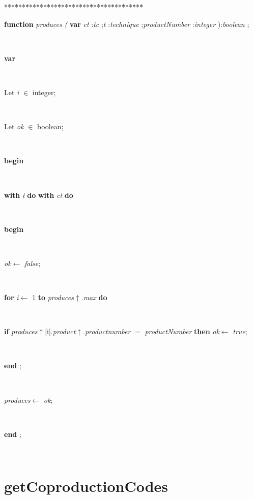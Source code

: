 \begin{tabbing}
***\=***\=***\=***\=***\=***\=***\=***\=***\=***\=***\=***\=***\=\kill
\parbox{14cm}{\textsf{\textbf{function}   \textit{produces} \textit{(} \textbf{var}  \textit{ct} :\textit{tc} ;\textit{t}  :\textit{technique} ;\textit{productNumber} :\textit{integer} ):\textit{boolean} ;}}\\
\+\parbox{14cm}{\textsf{\textbf{var} }}\\
\parbox{14cm}{\textsf{Let \textit{i} $\in$ integer;}}\\
\parbox{14cm}{\textsf{Let \textit{ok} $\in$ boolean;}}\\
\-\<\+\parbox{14cm}{\textsf{\textbf{begin} }}\\
\+\parbox{14cm}{\textsf {\textbf {with } \textsf{\textit{t}} \textbf{ do }  \textbf{ with } \textsf{\textit{ct}} \textbf{ do } }}\\
\<\parbox{14cm}{\textsf{\textbf{begin} }}\\
\parbox{14cm}{\textsf{\textit{ok}$\leftarrow$ \textit{false}}; }\\
\+\parbox{14cm}{\textsf {\textbf {for } \textsf{\textit{i}$\leftarrow$ 1} \textbf{ to } \textsf{\textit{produces}$\uparrow$.\textit{max}} \textbf{ do } }}\\
\-\parbox{14cm}{\textsf {\textbf {if } \textsf{\textit{produces}$\uparrow$\textit{}[i].\textit{product}$\uparrow$.\textit{productnumber} $=$ \textit{productNumber}} \textbf{ then } \textsf{\textit{ok}$\leftarrow$ \textit{true}}; }}\\
\<\-\parbox{14cm}{\textsf{\textbf{end} ;}}\\
\parbox{14cm}{\textsf{\textit{produces}$\leftarrow$ \textit{ok}}; }\\
\<\-\parbox{14cm}{\textsf{\textbf{end} ;}}\\
\end{tabbing}
\section{getCoproductionCodes}\label{sec:technologiesgetCoproductionCodes}

